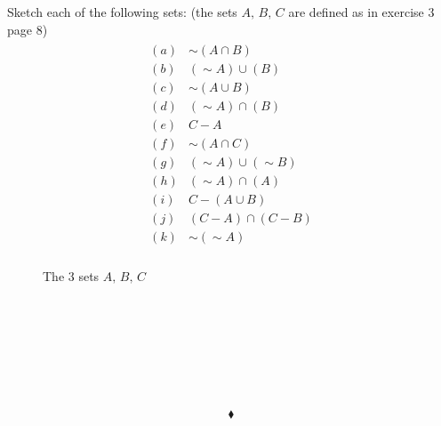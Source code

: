 \subsection{}
\begin{tcolorbox}
Sketch each of the following sets: (the sets $A,\, B,\, C$ are defined as in exercise $3$page $8$)
\begin{align*}
\begin{array}{ll}
(a)&\sim(A\cap B)\\
(b)&(\sim A)\cup (B)\\
(c)&\sim(A\cup B)\\
(d)&(\sim A)\cap (B)\\
(e)&C - A\\
(f)&\sim(A\cap C)\\
(g)&(\sim A)\cup(\sim B)\\
(h)&(\sim A)\cap (A)\\
(i)&C-(A \cup B)\\
(j)&(C-A)\cap (C-B)\\
(k)&\sim(\sim A)\\
\end{array}
\end{align*}
\end{tcolorbox}
\begin{figure}[H]%
    \centering
    
\caption{The 3 sets $A,\,B,\, C$}
\label{fig:fig_p8b}
\end{figure}
\begin{figure}[H]%
    \centering
    \\
    \\
    \subfloat[$C-A$]{}
    \\
\label{fig:fig_p8b}
\end{figure}
\begin{figure}[H]%
    \centering
    \subfloat[$(\sim A)\cap (A)= \emptyset$]{}\\
    \subfloat[$C-(A \cup B) $]{}
    \subfloat[$(C-A)\cap (C-B)$]{}\\
\label{fig:fig_p8b}
\end{figure}
$$\blacklozenge$$

